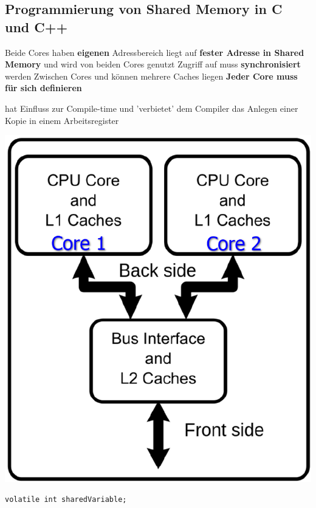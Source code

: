 \subsection{Programmierung von Shared Memory in C und C++}

\begin{minipage}[t]{0.56\columnwidth}
    \begin{outline}
        \1 Beide Cores haben \textbf{eigenen} Adressbereich
        \1  liegt auf \textbf{fester Adresse in Shared Memory} und wird von
            beiden Cores genutzt
        \1 Zugriff auf  muss \textbf{synchronisiert} werden
        \1 Zwischen Cores und  können mehrere Caches liegen
        \1 \textbf{Jeder Core muss}  \textbf{für sich definieren} \textrightarrow\ 
    \end{outline}

    \vspace{0.2cm}
     hat Einfluss zur Compile-time und 'verbietet' dem Compiler das Anlegen einer Kopie in einem Arbeitsregister
\end{minipage}
\hfill
\begin{minipage}[t]{0.42\columnwidth}
    \includegraphics[width=\columnwidth, align=t]{images/multicore_shared_memory.png}
\begin{lstlisting}[belowskip=0mm, morekeywords={[3], sharedVariable}]
    volatile int sharedVariable;
\end{lstlisting}
\end{minipage}



